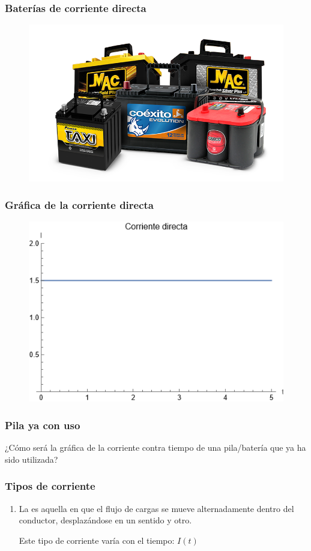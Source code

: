 \documentclass[14pt]{beamer}
\begin{document}
\begin{frame}
\frametitle{Baterías de corriente directa}
\begin{figure}
    \centering
    \includegraphics[scale=0.4]{Imagenes/Baterias_02.png}
\end{figure}
\end{frame}
\begin{frame}
\frametitle{Gráfica de la corriente directa}
\begin{figure}
    \centering
    \includegraphics[scale=0.7]{Imagenes/Corriente_01.png}
\end{figure}
\end{frame}
\begin{frame}
\frametitle{Pila ya con uso}
¿Cómo será la gráfica de la corriente contra tiempo de una pila/batería que ya ha sido utilizada?
\end{frame}
\begin{frame}
\frametitle{Tipos de corriente}
\begin{enumerate}[<+->]
\conti
\item La  \pause es aquella en que el flujo de cargas se mueve alternadamente dentro del conductor, desplazándose en un sentido y otro.

Este tipo de corriente varía con el tiempo: $I (t)$
\end{enumerate}
\end{frame}
\end{document}
